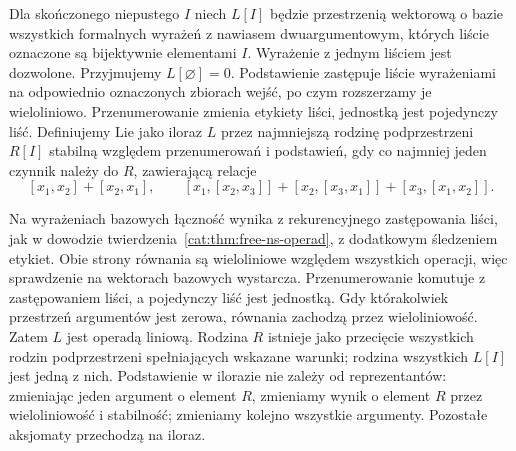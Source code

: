 \begin{definicja}\label{cat:def:lie-operad}
Dla skończonego niepustego $I$ niech $L[I]$ będzie przestrzenią wektorową o bazie wszystkich formalnych wyrażeń z nawiasem dwuargumentowym, których liście oznaczone są bijektywnie elementami $I$. Wyrażenie z jednym liściem jest dozwolone. Przyjmujemy $L[\varnothing]=0$. Podstawienie zastępuje liście wyrażeniami na odpowiednio oznaczonych zbiorach wejść, po czym rozszerzamy je wieloliniowo. Przenumerowanie zmienia etykiety liści, jednostką jest pojedynczy liść. Definiujemy $\mathrm{Lie}$ jako iloraz $L$ przez najmniejszą rodzinę podprzestrzeni $R[I]$ stabilną względem przenumerowań i podstawień, gdy co najmniej jeden czynnik należy do $R$, zawierającą relacje
\[
 [x_1,x_2]+[x_2,x_1],\qquad
 [x_1,[x_2,x_3]]+[x_2,[x_3,x_1]]+[x_3,[x_1,x_2]].
\]
\end{definicja}
Na wyrażeniach bazowych łączność wynika z rekurencyjnego zastępowania liści, jak w dowodzie twierdzenia~\ref{cat:thm:free-ns-operad}, z dodatkowym śledzeniem etykiet. Obie strony równania są wieloliniowe względem wszystkich operacji, więc sprawdzenie na wektorach bazowych wystarcza. Przenumerowanie komutuje z zastępowaniem liści, a pojedynczy liść jest jednostką. Gdy którakolwiek przestrzeń argumentów jest zerowa, równania zachodzą przez wieloliniowość. Zatem $L$ jest operadą liniową. Rodzina $R$ istnieje jako przecięcie wszystkich rodzin podprzestrzeni spełniających wskazane warunki; rodzina wszystkich $L[I]$ jest jedną z nich. Podstawienie w ilorazie nie zależy od reprezentantów: zmieniając jeden argument o element $R$, zmieniamy wynik o element $R$ przez wieloliniowość i stabilność; zmieniamy kolejno wszystkie argumenty. Pozostałe aksjomaty przechodzą na iloraz.

